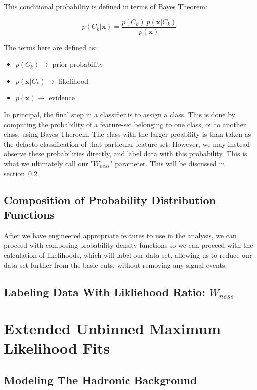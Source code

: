 This conditional probability is defined in terms of Bayes Theorem:

\begin{equation}
	\label{eq:bayes_theorm}
p(C_k \vert \mathbf{x}) = \frac{p(C_k) \ p(\mathbf{x} \vert C_k)}{p(\mathbf{x})}
\end{equation}

The terms here are defined as:
\begin{itemize}
	\item $p(C_k)\rightarrow$ prior probability
	\item $p(\mathbf{x} \vert C_k)\rightarrow$ likelihood
	\item $p(\mathbf{x})\rightarrow$ evidence
\end{itemize}

In principal, the final step in a classifier is to assign a class. This is done
by computing the probability of a feature-set belonging to one class, or to
another class, using Bayes Theroem. The class with the larger proability is than
taken as the defacto classification of that particular feature set. However, we
may instead observe these probabilities directly, and label data with this
probability. This is what we ultimately call our "$W_{ness}$" parameter. This
will be discussed in section~\ref{ssec:likelihood}.

\subsection{Composition of Probability Distribution Functions}
After we have engineered appropriate features to use in the analysis, we can
proceed with composing probability density functions so we can proceed with the
calculation of likelihoods, which will label our data set, allowing us to reduce
our data set further from the basic cuts, without removing any signal events.


\subsection{Labeling Data With Likliehood Ratio: $W_{ness}$}
\label{ssec:likelihood}
\section{Extended Unbinned Maximum Likelihood Fits}
\subsection{Modeling The Hadronic Background}
